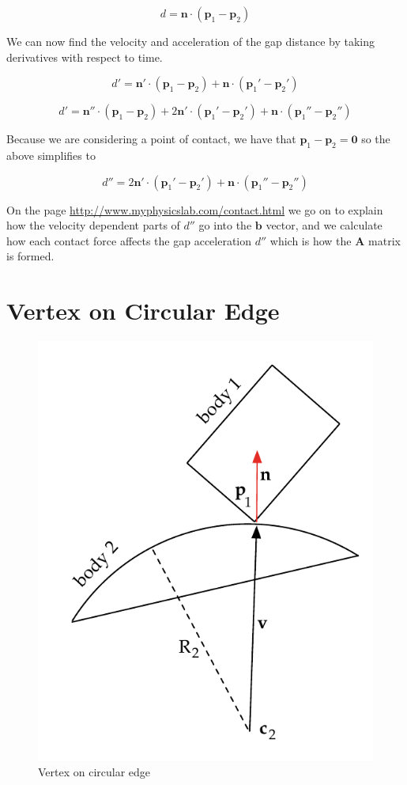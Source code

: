 \documentclass[final]{article}
\begin{document}
\begin{equation}\label{straight_vertex}
  d = \mathbf{n} \cdot (\mathbf{p}_1 - \mathbf{p}_2)
\end{equation}

We can now find the velocity and acceleration of the gap distance by taking derivatives
with respect to time.

\begin{equation}\label{straight_vertex_velocity}
  d' = \mathbf{n}' \cdot (\mathbf{p}_1 - \mathbf{p}_2)
      + \mathbf{n} \cdot (\mathbf{p}_1' - \mathbf{p}_2')
\end{equation}

\begin{equation}\label{straight_vertex_accel_1}
  d' = \mathbf{n}'' \cdot (\mathbf{p}_1 - \mathbf{p}_2)
      + 2 \mathbf{n}' \cdot (\mathbf{p}_1' - \mathbf{p}_2')
      + \mathbf{n} \cdot (\mathbf{p}_1'' - \mathbf{p}_2'')
\end{equation}

Because we are considering a point of contact, we have that $\mathbf{p}_1 - \mathbf{p}_2
= \mathbf{0}$ so the above simplifies to

\begin{equation}\label{straight_vertex_accel_2}
  d'' = 2 \mathbf{n}' \cdot (\mathbf{p}_1' - \mathbf{p}_2')
      + \mathbf{n} \cdot (\mathbf{p}_1'' - \mathbf{p}_2'')
\end{equation}

On the page \url{http://www.myphysicslab.com/contact.html} we go on to explain how the
velocity dependent parts of $d''$ go into the $\mathbf{b}$ vector, and we calculate how
each contact force affects the gap acceleration $d''$ which is how the $\mathbf{A}$
matrix is formed.



\section{Vertex on Circular Edge}

\begin{figure}[ht]
    \centering
    \includegraphics[width=0.45 \textwidth]{CEP_vertex_circle_edge.pdf}
    \caption{Vertex on circular edge}
    \label{fig:vertex_on_circle}
\end{figure}
\end{document}

